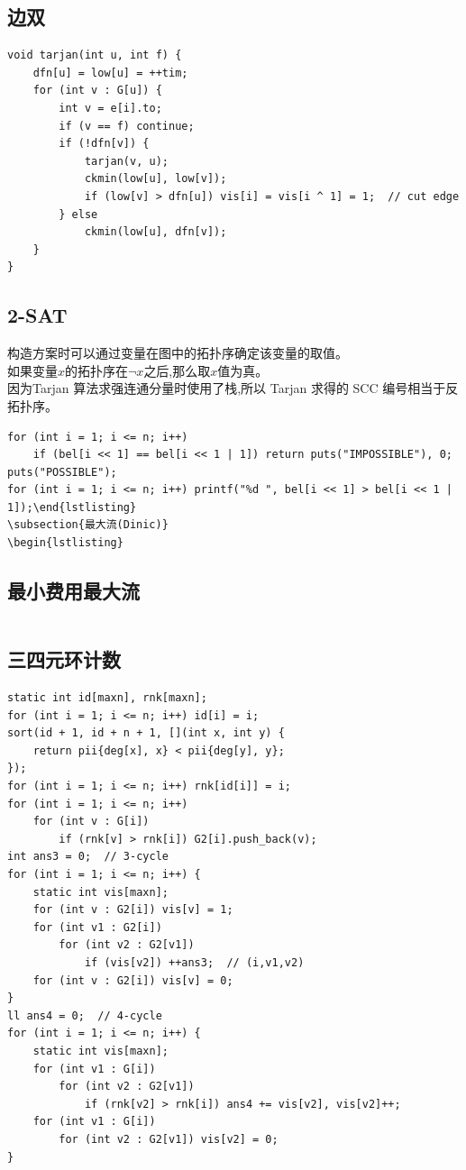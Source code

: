 \documentclass[twoside]{article}
\begin{document}
\subsection{边双}
\begin{lstlisting}
void tarjan(int u, int f) {
	dfn[u] = low[u] = ++tim;
	for (int v : G[u]) {
		int v = e[i].to;
		if (v == f) continue;
		if (!dfn[v]) {
			tarjan(v, u);
			ckmin(low[u], low[v]);
			if (low[v] > dfn[u]) vis[i] = vis[i ^ 1] = 1;  // cut edge
		} else
			ckmin(low[u], dfn[v]);
	}
}
\end{lstlisting}
\subsection{2-SAT}
构造方案时可以通过变量在图中的拓扑序确定该变量的取值。\\
如果变量$x$的拓扑序在$\lnot x$之后,那么取$x$值为真。\\
因为Tarjan 算法求强连通分量时使用了栈,所以 Tarjan 求得的 SCC
编号相当于反拓扑序。
\begin{lstlisting}
for (int i = 1; i <= n; i++)
	if (bel[i << 1] == bel[i << 1 | 1]) return puts("IMPOSSIBLE"), 0;
puts("POSSIBLE");
for (int i = 1; i <= n; i++) printf("%d ", bel[i << 1] > bel[i << 1 | 1]);\end{lstlisting}
\subsection{最大流(Dinic)}
\begin{lstlisting}

\end{lstlisting}
\subsection{最小费用最大流}
\begin{lstlisting}

\end{lstlisting}
\subsection{三四元环计数}
\begin{lstlisting}
static int id[maxn], rnk[maxn];
for (int i = 1; i <= n; i++) id[i] = i;
sort(id + 1, id + n + 1, [](int x, int y) {
	return pii{deg[x], x} < pii{deg[y], y};
});
for (int i = 1; i <= n; i++) rnk[id[i]] = i;
for (int i = 1; i <= n; i++)
	for (int v : G[i])
		if (rnk[v] > rnk[i]) G2[i].push_back(v);
int ans3 = 0;  // 3-cycle
for (int i = 1; i <= n; i++) {
	static int vis[maxn];
	for (int v : G2[i]) vis[v] = 1;
	for (int v1 : G2[i])
		for (int v2 : G2[v1])
			if (vis[v2]) ++ans3;  // (i,v1,v2)
	for (int v : G2[i]) vis[v] = 0;
}
ll ans4 = 0;  // 4-cycle
for (int i = 1; i <= n; i++) {
	static int vis[maxn];
	for (int v1 : G[i])
		for (int v2 : G2[v1])
			if (rnk[v2] > rnk[i]) ans4 += vis[v2], vis[v2]++;
	for (int v1 : G[i])
		for (int v2 : G2[v1]) vis[v2] = 0;
}\end{lstlisting}
\end{document}
